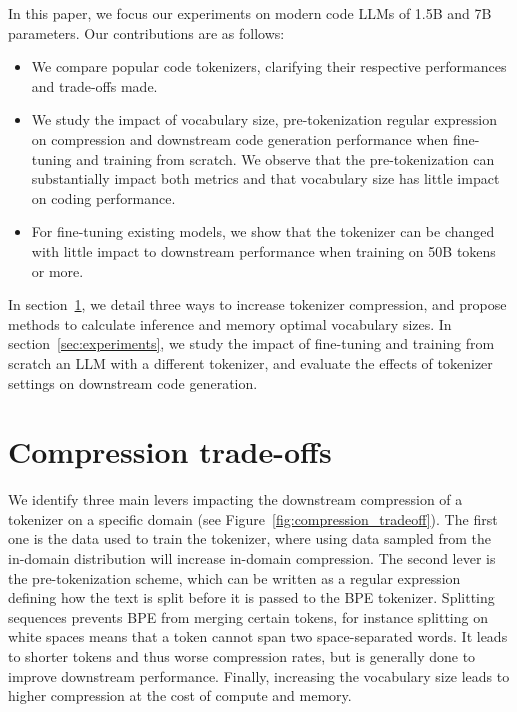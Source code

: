 In this paper, we focus our experiments on modern code LLMs of 1.5B and 7B parameters. Our contributions are as follows:

\begin{itemize}
    \item We compare popular code tokenizers, clarifying their respective performances and trade-offs made.
    \item We study the impact of vocabulary size, pre-tokenization regular expression on compression and downstream code generation performance when fine-tuning and training from scratch. We observe that the pre-tokenization can substantially impact both metrics and that vocabulary size has little impact on coding performance.
    \item For fine-tuning existing models, we show that the tokenizer can be changed with little impact to downstream performance when training on 50B tokens or more. 
\end{itemize}

In section~\ref{sec:compression-tradeoffs}, we detail three ways to increase tokenizer compression, and propose methods to calculate inference and memory optimal vocabulary sizes. In section~\ref{sec:experiments}, we study the impact of fine-tuning and training from scratch an LLM with a different tokenizer, and evaluate the effects of tokenizer settings on downstream code generation. 

\section{Compression trade-offs}
\label{sec:compression-tradeoffs}

We identify three main levers impacting the downstream compression of a tokenizer on a specific domain (see Figure~\ref{fig:compression_tradeoff}). 
The first one is the data used to train the tokenizer, where using data sampled from the in-domain distribution will increase in-domain compression. The second lever is the pre-tokenization scheme, which can be written as a regular expression defining how the text is split before it is passed to the BPE tokenizer. Splitting sequences prevents BPE from merging certain tokens, for instance splitting on white spaces means that a token cannot span two space-separated words. It leads to shorter tokens and thus worse compression rates, but is generally done to improve downstream performance. Finally, increasing the vocabulary size leads to higher compression at the cost of compute and memory.

